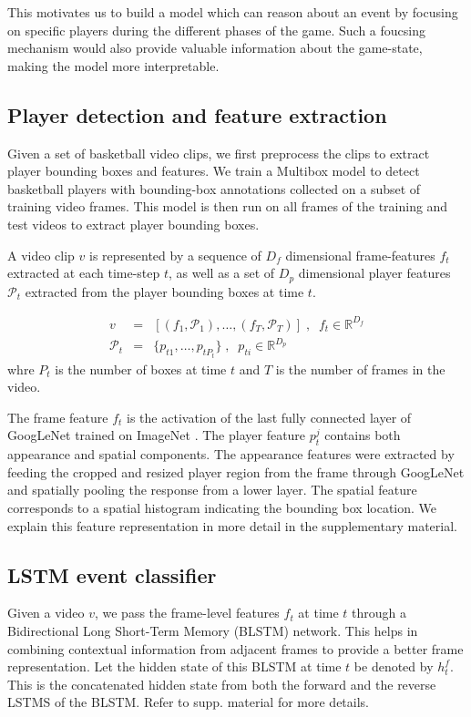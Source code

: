 \documentclass[10pt,twocolumn,letterpaper]{article}
\begin{document}
This motivates us to build a model which can reason about an event by focusing
on specific players during the different phases of the game.  Such a foucsing
mechanism would also provide valuable information about the game-state, making
the model more interpretable.

\subsection{Player detection and feature extraction}
Given a set of basketball video clips, we first preprocess the clips to extract
player bounding boxes and features. We train a Multibox model \cite{} to detect
basketball players with bounding-box annotations collected on a subset of
training video frames. This model is then run on all frames of the training and
test videos to extract player bounding boxes.

A video clip $v$ is represented by a sequence of $D_f$ dimensional
frame-features $f_t$ extracted at each time-step $t$, as well as a set of $D_p$
dimensional player features $\mathcal{P}_t$ extracted from the player bounding
boxes at time $t$.

\begin{eqnarray}
  v & = & \left[ \left(f_1, \mathcal{P}_1\right), \dots,
\left(f_T, \mathcal{P}_T\right) \right]\;,\;\;f_t \in \mathbb{R}^{D_f} \\ \nonumber
\mathcal{P}_t & = & \{ p_{t1}, \dots, p_{t{P_t}} \}\;,\;\;p_{ti} \in \mathbb{R}^{D_p} \nonumber
\end{eqnarray}whre $P_t$ is the number of boxes at time $t$ and $T$ is the number of frames
in the video.

The frame feature $f_t$ is the activation of the last fully connected layer of
GoogLeNet \cite{} trained on ImageNet \cite{}.  The player feature $p_t^j$
contains both appearance and spatial components. The appearance features were
extracted by feeding the cropped and resized player region from the frame
through GoogLeNet and spatially pooling the response from a lower layer. The
spatial feature corresponds to a spatial histogram indicating the bounding box
location.  We explain this feature representation in more detail in the
supplementary material.

\subsection{LSTM event classifier}
Given a video $v$, we pass the frame-level features $f_t$ at time $t$ through a
Bidirectional Long Short-Term Memory (BLSTM) network. This helps in combining
contextual information from adjacent frames to provide a better frame
representation.  Let the hidden state of this BLSTM at time $t$ be denoted by
$h^f_t$.  This is the concatenated hidden state from both the forward and the
reverse LSTMS of the BLSTM. Refer to supp.  material for more details.
\end{document}

